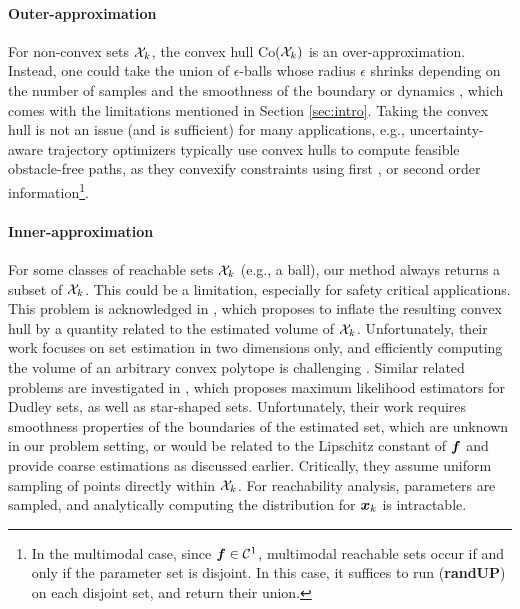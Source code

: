 \documentclass{article}
\begin{document}
\vspace{-2mm}\paragraph{Outer-approximation} For non-convex sets $\mathcal{X}_k$, the convex hull \textrm{Co}$(\mathcal{X}_k)$ is an over-approximation. 
Instead, %
one could take the union of $\epsilon$-balls whose radius $\epsilon$ shrinks depending on the number of samples and the smoothness of the boundary  \citep{Kor1993_BookMinimaxImgReconstr,Rodriguez2016} or dynamics \citep{LiebenweinRSS2018}, which comes with the limitations mentioned in Section \ref{sec:intro}. 
Taking the convex hull is not an issue (and is sufficient) for many applications, e.g., 
uncertainty-aware trajectory optimizers typically use convex hulls to compute feasible obstacle-free paths, as they convexify constraints using first \citep{LewBonalli2020}, or second order information\footnote{In the multimodal case, since  $\bm{f}\in\mathcal{C}^1$, multimodal reachable sets  occur if and only if the parameter set is disjoint. In this case, it suffices to run (\textbf{randUP}) on each disjoint set, and return their union.}.

\vspace{-2mm}\paragraph{Inner-approximation} For some classes of reachable sets $\mathcal{X}_k$ (e.g., a ball), our method always returns a subset of $\mathcal{X}_k$. This could be a limitation, especially for safety critical applications. This problem is acknowledged in \citep{RipleyPoissonForest1977}, which proposes to inflate the resulting convex hull by a quantity related to the estimated volume of $\mathcal{X}_k$. Unfortunately, their work focuses on set estimation in two dimensions only, and efficiently computing the volume of an arbitrary convex polytope is challenging \citep{Bueler2000}.
Similar related problems are investigated in \citep[Chap. 5.4-6,7.5]{Kor1993_BookMinimaxImgReconstr}, which proposes maximum likelihood estimators for Dudley sets, as well as star-shaped sets. Unfortunately, their work requires smoothness properties of the boundaries of the estimated set, which are unknown in our problem setting, or would be related to the Lipschitz constant of $\bm{f}$ and provide coarse estimations as discussed earlier. Critically, they assume uniform sampling of points directly within $\mathcal{X}_k$. For reachability analysis, parameters %
are sampled, and analytically computing the distribution for $\bm{x}_k$ is intractable. 
\end{document}
